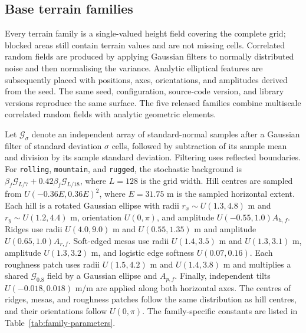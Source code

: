 \documentclass[11pt]{article}
\begin{document}
\subsection{Base terrain families}

Every terrain family is a single-valued height field covering the complete
grid; blocked areas still contain terrain values and are not missing cells.
Correlated random fields are produced by applying Gaussian filters to normally
distributed noise and then normalising the variance. Analytic elliptical
features are subsequently placed with positions, axes, orientations, and
amplitudes derived from the seed. The same seed, configuration, source-code
version, and library versions reproduce the same surface. The five released
families combine multiscale correlated random fields with analytic geometric
elements.

Let $\mathcal{G}_{\sigma}$ denote an independent array of standard-normal
samples after a Gaussian filter of standard deviation $\sigma$ cells, followed
by subtraction of its sample mean and division by its sample standard
deviation. Filtering uses reflected boundaries. For \texttt{rolling},
\texttt{mountain}, and \texttt{rugged}, the stochastic background is
$\beta_f\mathcal{G}_{L/7}+0.42\beta_f\mathcal{G}_{L/18}$, where $L=128$ is the
grid width. Hill centres are sampled from
$U(-0.36E,0.36E)^2$, where $E=31.75$ m is the sampled horizontal extent. Each
hill is a rotated Gaussian ellipse with radii
$r_x\sim U(1.3,4.8)$ m and $r_y\sim U(1.2,4.4)$ m, orientation
$U(0,\pi)$, and amplitude $U(-0.55,1.0)A_{h,f}$. Ridges use radii
$U(4.0,9.0)$ m and $U(0.55,1.35)$ m and amplitude
$U(0.65,1.0)A_{r,f}$. Soft-edged mesas use radii $U(1.4,3.5)$ m and
$U(1.3,3.1)$ m, amplitude $U(1.3,3.2)$ m, and logistic edge softness
$U(0.07,0.16)$. Each roughness patch uses radii $U(1.5,4.2)$ m and
$U(1.4,3.8)$ m and multiplies a shared $\mathcal{G}_{0.8}$ field by a Gaussian
ellipse and $A_{p,f}$. Finally, independent tilts
$U(-0.018,0.018)$ m/m are applied along both horizontal axes. The
centres of ridges, mesas, and roughness patches follow the same distribution
as hill centres, and their orientations follow $U(0,\pi)$. The family-specific
constants are listed in Table~\ref{tab:family-parameters}.
\end{document}
